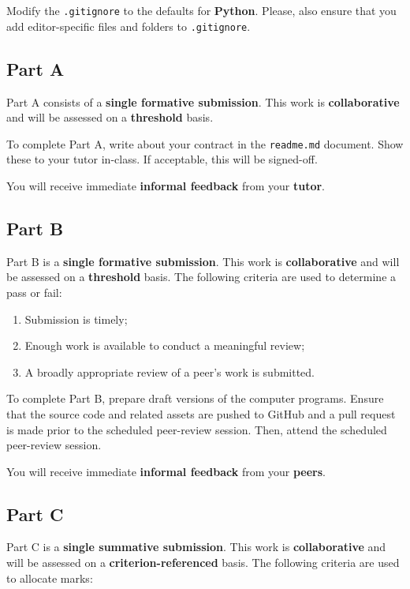 \documentclass{../fal_assignment}
\begin{document}
Modify the \texttt{.gitignore} to the defaults for \textbf{Python}. Please, also ensure that you add editor-specific files and folders to \texttt{.gitignore}. 

\subsection*{Part A}

Part A consists of a \textbf{single formative submission}. This work is \textbf{collaborative} and will be assessed on a \textbf{threshold} basis. 

To complete Part A, write about your contract in the \texttt{readme.md} document.  Show these to your tutor in-class.  If acceptable, this will be signed-off. 

You will receive immediate \textbf{informal feedback} from your \textbf{tutor}.

\subsection*{Part B}

Part B is a \textbf{single formative submission}. This work is \textbf{collaborative} and will be assessed on a \textbf{threshold} basis. The following criteria are used to determine a pass or fail:

\begin{enumerate}[label=(\alph*)]
	\item Submission is timely;
	\item Enough work is available to conduct a meaningful review;
	\item A broadly appropriate review of a peer's work is submitted.
\end{enumerate}

To complete Part B, prepare draft versions of the computer programs. Ensure that the source code and related assets are pushed to GitHub and a pull request is made prior to the scheduled peer-review session. Then, attend the scheduled peer-review session.

You will receive immediate \textbf{informal feedback} from your \textbf{peers}.

\subsection*{Part C}

Part C is a \textbf{single summative submission}. This work is \textbf{collaborative} and will be assessed on a \textbf{criterion-referenced} basis. The following criteria are used to allocate marks:
\end{document}
